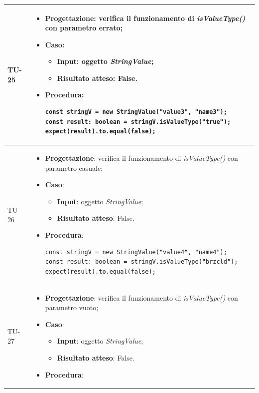 \begin{longtable}{|C{1.5cm}|C{14.5cm}|}
	\hline
	{TU-25} &  
	\begin{itemize}
		\item \textbf{Progettazione}: verifica il funzionamento di \emph{isValueType()} con parametro errato;
		\item \textbf{Caso}: 
		\begin{itemize}
			\item \textbf{Input}: oggetto \emph{StringValue};
			\item \textbf{Risultato atteso}: False.
		\end{itemize}
		\item \textbf{Procedura}:
		\begin{lstlisting}
const stringV = new StringValue("value3", "name3");
const result: boolean = stringV.isValueType("true");
expect(result).to.equal(false);		
		\end{lstlisting}
	\end{itemize}\\
	\hline
	{TU-26} &  
	\begin{itemize}
		\item \textbf{Progettazione}: verifica il funzionamento di \emph{isValueType()} con parametro casuale;
		\item \textbf{Caso}: 
		\begin{itemize}
			\item \textbf{Input}: oggetto \emph{StringValue};
			\item \textbf{Risultato atteso}: False.
		\end{itemize}
		\item \textbf{Procedura}:
		\begin{lstlisting}
const stringV = new StringValue("value4", "name4");
const result: boolean = stringV.isValueType("brzcld");
expect(result).to.equal(false);		
		\end{lstlisting}
	\end{itemize}\\
	\hline
	{TU-27} &  
	\begin{itemize}
		\item \textbf{Progettazione}: verifica il funzionamento di \emph{isValueType()} con parametro vuoto;
		\item \textbf{Caso}: 
		\begin{itemize}
			\item \textbf{Input}: oggetto \emph{StringValue};
			\item \textbf{Risultato atteso}: False.
		\end{itemize}
		\item \textbf{Procedura}:

\end{itemize}
\end{longtable}
